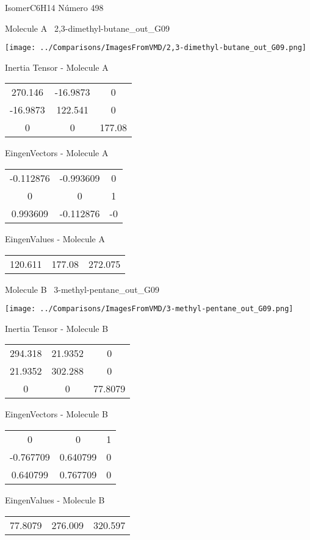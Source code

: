\vtab[-3cm]
\begin{center}
{\large IsomerC6H14 \tab Número 498}
\end{center}
\begin{multicols}{2}
\begin{center}

Molecule A \
2,3-dimethyl-butane\_out\_G09

\texttt{[image: ../Comparisons/ImagesFromVMD/2,3-dimethyl-butane\_out\_G09.png]}

Inertia Tensor - Molecule A \\
\begin{tabular}{|c c c|}
270.146	 & 	-16.9873	 & 	0	 \\
-16.9873	 & 	122.541	 & 	0	 \\
0	 & 	0	 & 	177.08
\end{tabular}

\vtab
 EingenVectors - Molecule A     \\
\begin{tabular}{|c c c|}
-0.112876	 & 	-0.993609	 & 	0	 \\
0	 & 	0	 & 	1	 \\
0.993609	 & 	-0.112876	 & 	-0
\end{tabular}

\vtab
 EingenValues - Molecule A     \\
\begin{tabular}{|c c c|}
120.611	 & 	177.08	 & 	272.075	 \\
\end{tabular}
\columnbreak

Molecule B \
3-methyl-pentane\_out\_G09

\texttt{[image: ../Comparisons/ImagesFromVMD/3-methyl-pentane\_out\_G09.png]}

Inertia Tensor - Molecule B \\
\begin{tabular}{|c c c|}
294.318	 & 	21.9352	 & 	0	 \\
21.9352	 & 	302.288	 & 	0	 \\
0	 & 	0	 & 	77.8079
\end{tabular}

\vtab
 EingenVectors - Molecule B     \\
\begin{tabular}{|c c c|}
0	 & 	0	 & 	1	 \\
-0.767709	 & 	0.640799	 & 	0	 \\
0.640799	 & 	0.767709	 & 	0
\end{tabular}

\vtab
 EingenValues - Molecule B     \\
\begin{tabular}{|c c c|}
77.8079	 & 	276.009	 & 	320.597	 \\
\end{tabular}

\end{center}
\end{multicols}

